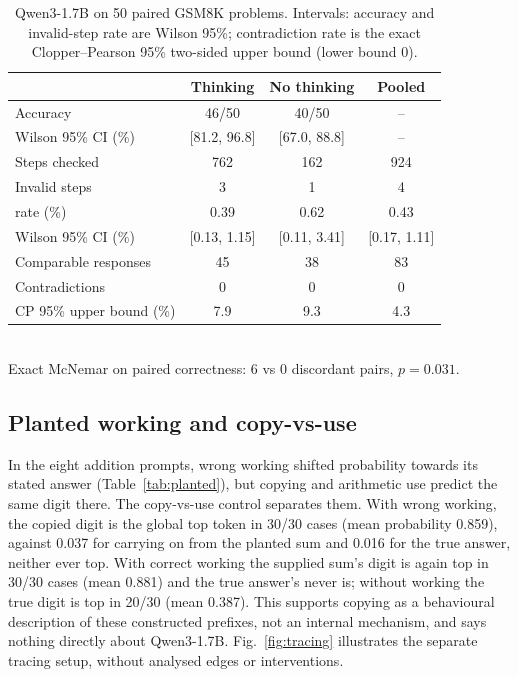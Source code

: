 \begin{table}[t]
\centering
\caption{Qwen3-1.7B on 50 paired GSM8K problems. Intervals: accuracy and invalid-step
rate are Wilson 95\%; contradiction rate is the exact Clopper--Pearson 95\% two-sided
upper bound (lower bound 0).}
\label{tab:gsm8k}
\footnotesize
\setlength{\tabcolsep}{4pt}
\begin{tabular}{@{}lccc@{}}
\toprule
 & Thinking & No thinking & Pooled \\
\midrule
Accuracy & 46/50 & 40/50 & -- \\
\quad Wilson 95\% CI (\%) & [81.2, 96.8] & [67.0, 88.8] & -- \\
Steps checked & 762 & 162 & 924 \\
Invalid steps & 3 & 1 & 4 \\
\quad rate (\%) & 0.39 & 0.62 & 0.43 \\
\quad Wilson 95\% CI (\%) & [0.13, 1.15] & [0.11, 3.41] & [0.17, 1.11] \\
Comparable responses & 45 & 38 & 83 \\
Contradictions & 0 & 0 & 0 \\
\quad CP 95\% upper bound (\%) & 7.9 & 9.3 & 4.3 \\
\bottomrule
\end{tabular}
\\[2pt]
{\footnotesize Exact McNemar on paired correctness: 6 vs 0 discordant pairs, $p = 0.031$.}
\end{table}

\subsection{Planted working and copy-vs-use}\label{sec:res-planted}

In the eight addition prompts, wrong working shifted probability towards its stated
answer (Table~\ref{tab:planted}), but copying and arithmetic use predict the same digit
there. The copy-vs-use control separates them. With wrong working, the copied digit is
the global top token in 30/30 cases (mean probability 0.859), against 0.037 for carrying
on from the planted sum and 0.016 for the true answer, neither ever top. With correct
working the supplied sum's digit is again top in 30/30 cases (mean 0.881) and the true
answer's never is; without working the true digit is top in 20/30 (mean 0.387). This
supports copying as a behavioural description of these constructed prefixes, not an
internal mechanism, and says nothing directly about Qwen3-1.7B. Fig.~\ref{fig:tracing}
illustrates the separate tracing setup, without analysed edges or interventions.

